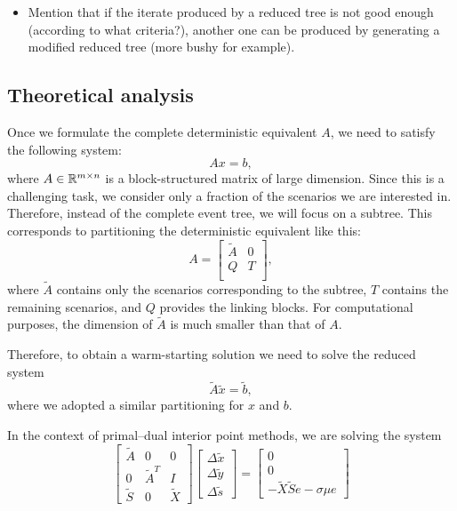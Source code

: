 {\begin{itemize}

\item Mention that if the iterate produced by a reduced tree 
is not good enough (according to what criteria?), another one 
can be produced by generating a modified reduced tree (more 
bushy for example).
\end{itemize}


\subsection{Theoretical analysis}

Once we formulate the complete deterministic equivalent $A$, we need 
to satisfy the following system:
\[
Ax=b,
\]
where $A\in \mathbb{R}^{m\times n}$ is a block-structured matrix of 
large dimension. Since this is a challenging task, we consider 
only a fraction of the scenarios we are interested in. Therefore, 
instead of the complete event tree, we will focus on a subtree. 
This corresponds to partitioning the deterministic equivalent 
like this:
\[
A = \left[ \begin{array}{cc}
    \tilde{A} & 0 \\ Q & T \\
    \end{array} \right],
\]
where $\tilde{A}$ contains only the scenarios corresponding 
to the subtree, $T$ contains the remaining scenarios, and $Q$ 
provides the linking blocks. For computational purposes, the 
dimension of $\tilde{A}$ is much smaller than that of $A$.

Therefore, to obtain a warm-starting solution we need to solve 
the reduced system
\[
\tilde{A}\tilde{x}=\tilde{b},
\]
where we adopted a similar partitioning for $x$ and $b$.

In the context of primal--dual interior point methods, we are 
solving the system
\[
\left[ \begin{array}{ccc}
    \tilde{A} & 0 & 0 \\
    0 & \tilde{A}^T & I \\
    \tilde{S} & 0 & \tilde{X}
    \end{array} \right]
\left[ \begin{array}{c}
    \Delta\tilde{x} \\ \Delta\tilde{y} \\ \Delta\tilde{s}
\end{array} \right] = 
\left[ \begin{array}{c}
      0 \\ 0 \\ -\tilde{X}\tilde{S}e - \sigma\mu e
\end{array} \right]
\]

}

